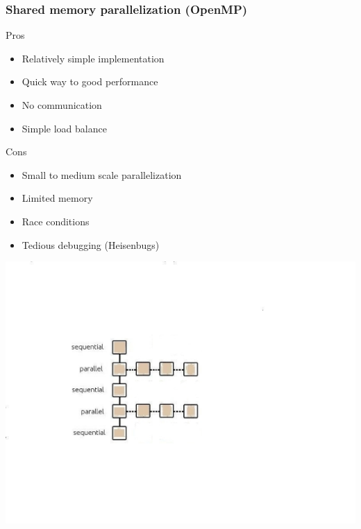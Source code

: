 \documentclass[mathserif]{beamer}
\begin{document}
\begin{frame}
    \frametitle{Shared memory parallelization (OpenMP)}
    \begin{minipage}[b]{0.45\linewidth}
	Pros
	\begin{itemize}
	    \item Relatively simple implementation
	    \item Quick way to good performance
	    \item No communication
	    \item Simple load balance
	\end{itemize}
	Cons
        \begin{itemize}
	    \item Small to medium scale parallelization
	    \item Limited memory
	    \item Race conditions
	    \item Tedious debugging (Heisenbugs)
	\end{itemize}
    \end{minipage}
    \hfill
    \begin{minipage}[b]{0.4\linewidth}
	\includegraphics[bb = 120 160 460 450, clip, scale=0.4]{figures/parallel_OMP.pdf}
	\ \\
	\ \\
	\ \\
	\ \\
    \end{minipage}
\end{frame}
\end{document}
